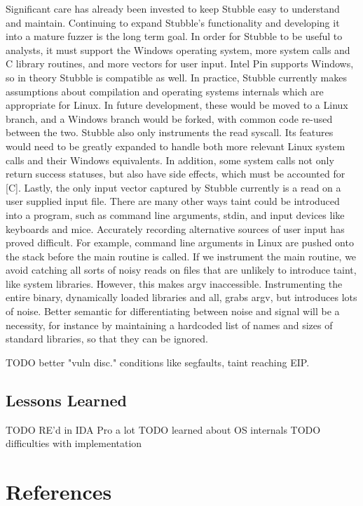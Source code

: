 \documentclass[11pt,expanded,copyright]{fsuthesis}
\begin{document}
Significant care has already been invested to keep Stubble easy to understand and maintain. Continuing to expand Stubble's functionality and developing it into a mature fuzzer is the long term goal. In order for Stubble to be useful to analysts, it must support the Windows operating system, more system calls and C library routines, and more vectors for user input. Intel Pin supports Windows, so in theory Stubble is compatible as well. In practice, Stubble currently makes assumptions about compilation and operating systems internals which are appropriate for Linux. In future development, these would be moved to a Linux branch, and a Windows branch would be forked, with common code re-used between the two. Stubble also only instruments the read syscall. Its features would need to be greatly expanded to handle both more relevant Linux system calls and their Windows equivalents. In addition, some system calls not only return success statuses, but also have side effects, which must be accounted for [C]. Lastly, the only input vector captured by Stubble currently is a read on a user supplied input file. There are many other ways taint could be introduced into a program, such as command line arguments, stdin, and input devices like keyboards and mice. Accurately recording alternative sources of user input has proved difficult. For example, command line arguments in Linux are pushed onto the stack before the main routine is called. If we instrument the main routine, we avoid catching all sorts of noisy reads on files that are unlikely to introduce taint, like system libraries. However, this makes argv inaccessible. Instrumenting the entire binary, dynamically loaded libraries and all, grabs argv, but introduces lots of noise. Better semantic for differentiating between noise and signal will be a necessity, for instance by maintaining a hardcoded list of names and sizes of standard libraries, so that they can be ignored.

TODO better "vuln disc." conditions like segfaults, taint reaching EIP.


\section{Lessons Learned}

TODO RE'd in IDA Pro a lot
TODO learned about OS internals
TODO difficulties with implementation



\chapter{References}
\end{document}
